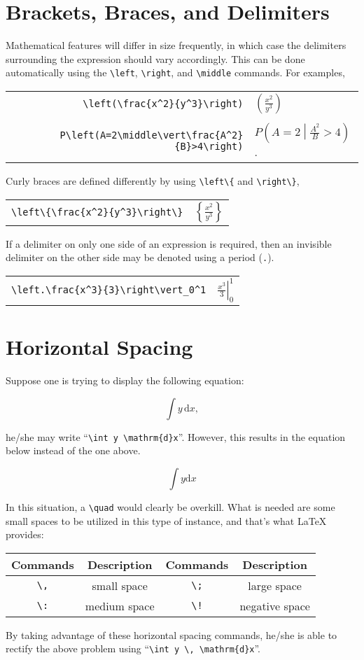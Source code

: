 \section{Brackets, Braces, and Delimiters}
\label{content:mathematics:brackets-braces-delimiters}

Mathematical features will differ in size frequently, in which case the delimiters surrounding the expression should vary accordingly. This can be done automatically using the \verb|\left|, \verb|\right|, and \verb|\middle| commands. For examples,

\begin{tabular}{rl}
    \verb|\left(\frac{x^2}{y^3}\right)| & \( \displaystyle \left(\frac{x^2}{y^3}\right) \) \\ 
    \\ 
    \verb|P\left(A=2\middle\vert\frac{A^2}{B}>4\right)| & \( \displaystyle P\left(A=2\middle\vert\frac{A^2}{B}>4\right) \).
\end{tabular}

Curly braces are defined differently by using \verb|\left\{| and \verb|\right\}|,

\begin{tabular}{rl}
    \verb|\left\{\frac{x^2}{y^3}\right\}| & \( \displaystyle \left\{\frac{x^2}{y^3}\right\} \)
\end{tabular}

If a delimiter on only one side of an expression is required, then an invisible delimiter on the other side may be denoted using a period (\texttt{.}).

\begin{tabular}{rl}
    \verb|\left.\frac{x^3}{3}\right\vert_0^1| & \( \displaystyle \left.\frac{x^3}{3}\right\vert_0^1 \)
\end{tabular}

\section{Horizontal Spacing}
\label{content:mathematics:horizontal-spacing}

Suppose one is trying to display the following equation:

\[\int y \, \mathrm{d}x,\]

he/she may write ``\verb|\int y \mathrm{d}x|''. However, this results in the equation below instead of the one above.

\[\int y \mathrm{d}x\]

In this situation, a \verb|\quad| would clearly be overkill. What is needed are some small spaces to be utilized in this type of instance, and that's what \LaTeX{} provides:

\begin{tabular}{cc|cc}
    \toprule
    Commands & Description & Commands & Description \\
    \midrule
    \verb|\,| & small space & \verb|\;| & large space \\
    \verb|\:| & medium space & \verb|\!| & negative space \\
    \bottomrule
\end{tabular}

By taking advantage of these horizontal spacing commands, he/she is able to rectify the above problem using ``\verb|\int y \, \mathrm{d}x|''.
